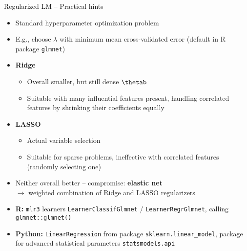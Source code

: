 
\begin{frame}{Regularized LM -- Practical hints}


\begin{itemize}
  \item Standard hyperparameter optimization problem
  \item E.g., choose $\lambda$ with minimum mean cross-validated error 
  (default in R package \texttt{glmnet})
\end{itemize}

\medskip


\begin{itemize}
  \item \textbf{Ridge}
  \begin{itemize} 
    \item Overall smaller, but still dense $\thetab$
    \item Suitable with many influential features present, handling correlated 
    features by shrinking their coefficients equally
  \end{itemize}
  \item \textbf{LASSO}
  \begin{itemize} 
    \item Actual variable selection
    \item Suitable for sparse problems, ineffective with correlated 
    features (randomly selecting one)
  \end{itemize}  
  \item Neither overall better -- compromise: \textbf{elastic net} \\
  $\rightarrow$ weighted 
  combination of Ridge and LASSO regularizers
\end{itemize}

\medskip


\begin{itemize}
    \item \textbf{R:} \texttt{mlr3} learners \texttt{LearnerClassifGlmnet} / 
    \texttt{LearnerRegrGlmnet}, calling \texttt{glmnet::glmnet()}
    \item \textbf{Python:} \texttt{LinearRegression} from package 
    \texttt{sklearn.linear\_model}, package for advanced statistical parameters 
    \texttt{statsmodels.api} 
  \end{itemize}

\end{frame}
